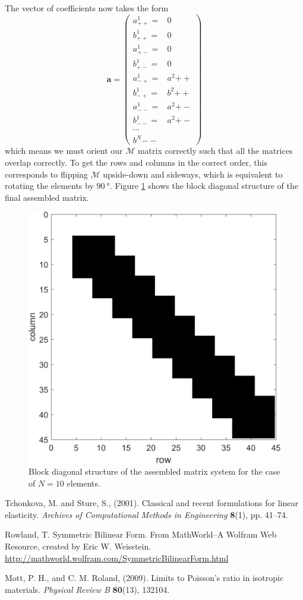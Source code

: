 \documentclass[11pt]{article}
\begin{document}
The vector of coefficients now takes the form
\begin{equation}
\bm{a} =
\begin{pmatrix}
	a^1_{++} = & 0 \\
	b^1_{++} = & 0 \\
	a^1_{+-} = & 0 \\
	b^1_{+-} = & 0 \\
	a^1_{-+} = & a^2{++} \\
	b^1_{-+} = & b^2{++} \\
	a^1_{--} = & a^2{+-} \\
	b^1_{--} = & a^2{+-} \\
	\cdots \\
	b^N{--}
\end{pmatrix}
\end{equation}
which means we must orient our $\mathcal{M}$ matrix correctly such that all the matrices overlap correctly. To get the rows and columns in the correct order, this corresponds to flipping $\mathcal{M}$ upside-down and sideways, which is equivalent to rotating the elements by $\SI{90}{\degree}$. Figure \ref{fig:M2b_spy} shows the block diagonal structure of the final assembled matrix.

\begin{figure}[!htb]
	\centering
	\includegraphics[width=0.7\linewidth]{M2b_spy.png}
	\caption{Block diagonal structure of the assembled matrix system for the case of $N=10$ elements.}
	\label{fig:M2b_spy}
\end{figure}

\clearpage
\begin{thebibliography}{9}
Tchonkova, M. and Sture, S., (2001). Classical and recent formulations for linear elasticity. \textit{Archives of Computational Methods in Engineering} \textbf{8}(1), pp. 41--74.

Rowland, T. Symmetric Bilinear Form. From MathWorld--A Wolfram Web Resource, created by Eric W. Weisstein. \url{http://mathworld.wolfram.com/SymmetricBilinearForm.html}

Mott, P. H., and C. M. Roland, (2009). Limits to Poisson's ratio in isotropic materials. \textit{Physical Review B} \textbf{80}(13), 132104.
\end{thebibliography}
\end{document}
